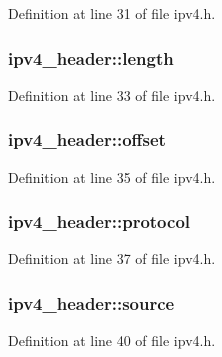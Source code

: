 Definition at line 31 of file ipv4.\+h.

\hypertarget{structipv4__header_a369155b66b339effb565ee713000d695}{
\subsubsection[{length}]{ ipv4\+\_\+header\+::length}}\label{structipv4__header_a369155b66b339effb565ee713000d695}


Definition at line 33 of file ipv4.\+h.

\hypertarget{structipv4__header_a6bae0493fa3323330e7c06c2d4ad0e4c}{
\subsubsection[{offset}]{ ipv4\+\_\+header\+::offset}}\label{structipv4__header_a6bae0493fa3323330e7c06c2d4ad0e4c}


Definition at line 35 of file ipv4.\+h.

\hypertarget{structipv4__header_ad08e98e98c2ccf2472f9740b68071979}{
\subsubsection[{protocol}]{ ipv4\+\_\+header\+::protocol}}\label{structipv4__header_ad08e98e98c2ccf2472f9740b68071979}


Definition at line 37 of file ipv4.\+h.

\hypertarget{structipv4__header_a87399a8dd7eb153478e63ce26450fe9c}{
\subsubsection[{source}]{ ipv4\+\_\+header\+::source}}\label{structipv4__header_a87399a8dd7eb153478e63ce26450fe9c}


Definition at line 40 of file ipv4.\+h.

